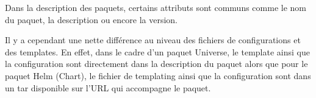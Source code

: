 \documentclass[11pt,fleqn]{book} %
\begin{document}
Dans la description des paquets, certains attributs sont communs comme le nom du paquet, la description ou encore la version.\newline

Il y a cependant une nette différence au niveau des fichiers de configurations et des templates. En effet, dans le cadre d'un paquet Universe, le template ainsi que la configuration sont directement dans la description du paquet alors que pour le paquet Helm (Chart), le fichier de templating ainsi que la configuration sont dans un tar disponible sur l'URL qui accompagne le paquet. \\



\end{document}
